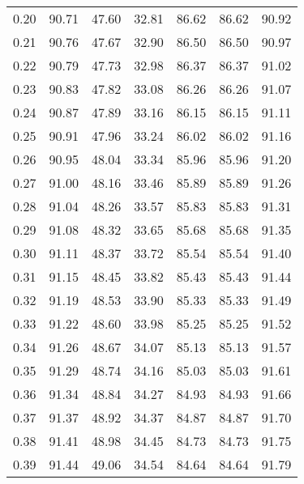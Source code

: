 \begin{tabular}{|c|c|c|c|c|c|c|}
      0.20 &     90.71 &     47.60 &      32.81 &   86.62 &      86.62 &         90.92 \\
      0.21 &     90.76 &     47.67 &      32.90 &   86.50 &      86.50 &         90.97 \\
      0.22 &     90.79 &     47.73 &      32.98 &   86.37 &      86.37 &         91.02 \\
      0.23 &     90.83 &     47.82 &      33.08 &   86.26 &      86.26 &         91.07 \\
      0.24 &     90.87 &     47.89 &      33.16 &   86.15 &      86.15 &         91.11 \\
      0.25 &     90.91 &     47.96 &      33.24 &   86.02 &      86.02 &         91.16 \\
      0.26 &     90.95 &     48.04 &      33.34 &   85.96 &      85.96 &         91.20 \\
      0.27 &     91.00 &     48.16 &      33.46 &   85.89 &      85.89 &         91.26 \\
      0.28 &     91.04 &     48.26 &      33.57 &   85.83 &      85.83 &         91.31 \\
      0.29 &     91.08 &     48.32 &      33.65 &   85.68 &      85.68 &         91.35 \\
      0.30 &     91.11 &     48.37 &      33.72 &   85.54 &      85.54 &         91.40 \\
      0.31 &     91.15 &     48.45 &      33.82 &   85.43 &      85.43 &         91.44 \\
      0.32 &     91.19 &     48.53 &      33.90 &   85.33 &      85.33 &         91.49 \\
      0.33 &     91.22 &     48.60 &      33.98 &   85.25 &      85.25 &         91.52 \\
      0.34 &     91.26 &     48.67 &      34.07 &   85.13 &      85.13 &         91.57 \\
      0.35 &     91.29 &     48.74 &      34.16 &   85.03 &      85.03 &         91.61 \\
      0.36 &     91.34 &     48.84 &      34.27 &   84.93 &      84.93 &         91.66 \\
      0.37 &     91.37 &     48.92 &      34.37 &   84.87 &      84.87 &         91.70 \\
      0.38 &     91.41 &     48.98 &      34.45 &   84.73 &      84.73 &         91.75 \\
      0.39 &     91.44 &     49.06 &      34.54 &   84.64 &      84.64 &         91.79 \\

\end{tabular}
